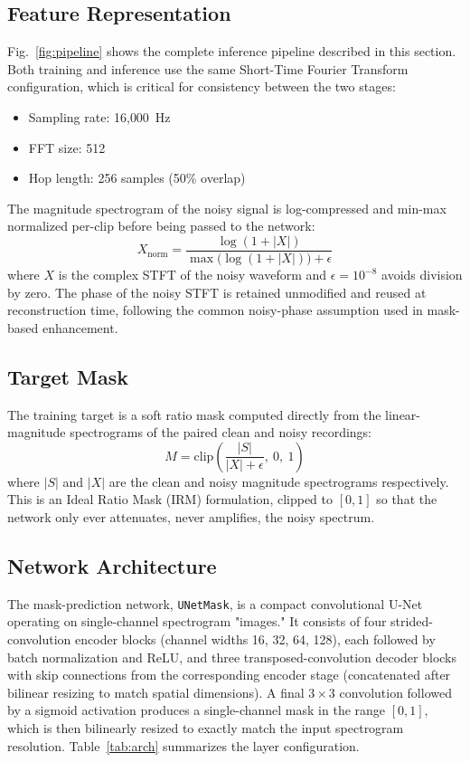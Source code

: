 \documentclass[conference]{IEEEtran}
\begin{document}
\subsection{Feature Representation}
Fig.~\ref{fig:pipeline} shows the complete inference pipeline described in this section. Both training and inference use the same Short-Time Fourier Transform configuration, which is critical for consistency between the two stages:
\begin{itemize}
    \item Sampling rate: 16{,}000~Hz
    \item FFT size: 512
    \item Hop length: 256 samples (50\% overlap)
\end{itemize}
The magnitude spectrogram of the noisy signal is log-compressed and min-max normalized per-clip before being passed to the network:
\begin{equation}
X_{\text{norm}} = \frac{\log(1 + |X|)}{\max\big(\log(1+|X|)\big) + \epsilon}
\end{equation}
where $X$ is the complex STFT of the noisy waveform and $\epsilon = 10^{-8}$ avoids division by zero. The phase of the noisy STFT is retained unmodified and reused at reconstruction time, following the common noisy-phase assumption used in mask-based enhancement.

\subsection{Target Mask}
The training target is a soft ratio mask computed directly from the linear-magnitude spectrograms of the paired clean and noisy recordings:
\begin{equation}
M = \text{clip}\left(\frac{|S|}{|X| + \epsilon},\ 0,\ 1\right)
\end{equation}
where $|S|$ and $|X|$ are the clean and noisy magnitude spectrograms respectively. This is an Ideal Ratio Mask (IRM) formulation, clipped to $[0,1]$ so that the network only ever attenuates, never amplifies, the noisy spectrum.

\subsection{Network Architecture}
The mask-prediction network, \texttt{UNetMask}, is a compact convolutional U-Net operating on single-channel spectrogram "images." It consists of four strided-convolution encoder blocks (channel widths 16, 32, 64, 128), each followed by batch normalization and ReLU, and three transposed-convolution decoder blocks with skip connections from the corresponding encoder stage (concatenated after bilinear resizing to match spatial dimensions). A final $3\times3$ convolution followed by a sigmoid activation produces a single-channel mask in the range $[0,1]$, which is then bilinearly resized to exactly match the input spectrogram resolution. Table~\ref{tab:arch} summarizes the layer configuration.
\end{document}
